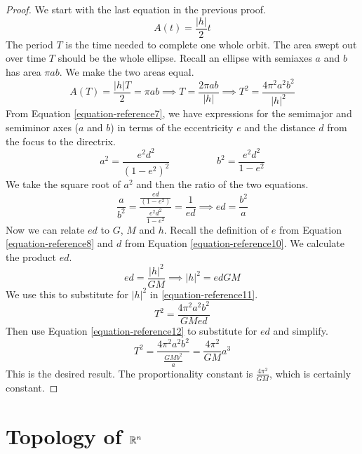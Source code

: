 \documentclass[fleqn,letterpaper]{report}
\begin{document}
\begin{proof}
We start with the last equation in the previous proof.
\begin{equation*}
A(t) = \frac{|h|}{2} t
\end{equation*}
The period $T$ is the time needed to complete one
whole orbit. The area swept out over time $T$ should be the
whole ellipse. Recall an ellipse with semiaxes $a$ and $b$ has
area $\pi a b$. We make the two areas equal.
\begin{equation}
\label{equation-reference11}
A(T) = \frac{|h|T}{2} = \pi a b \implies T = \frac{2\pi ab}{|h|}
\implies T^2 = \frac{4\pi^2 a^2 b^2}{|h|^2}
\end{equation}
From Equation \ref{equation-reference7}, we have expressions for the
semimajor and semiminor axes ($a$ and $b$) in terms of the
eccentricity $e$ and the distance $d$ from the focus to the
directrix. 
\begin{equation*}
a^2 = \frac{e^2 d^2}{(1-e^2)^2} \hspace{2cm} b^2 = \frac{e^2
d^2}{1-e^2}
\end{equation*}
We take the square root of $a^2$ and then the ratio of the
two equations.
\begin{equation}
\label{equation-reference12}
\frac{a}{b^2} =
\frac{\frac{ed}{(1-e^2)}}{\frac{e^2d^2}{1-e^2}} =
\frac{1}{ed} \implies ed = \frac{b^2}{a}
\end{equation}
Now we can relate $ed$ to $G$, $M$ and $h$. Recall the
definition of $e$ from Equation \ref{equation-reference8} and $d$
from Equation \ref{equation-reference10}. We calculate the product
$ed$. 
\begin{equation}
ed = \frac{|h|^2}{GM} \implies |h|^2 = edGM
\end{equation}
We use this to substitute for $|h|^2$ in 
\ref{equation-reference11}.
\begin{equation*}
T^2 = \frac{4\pi^2 a^2 b^2}{GMed} 
\end{equation*}
Then use Equation \ref{equation-reference12} to substitute for $ed$
and simplify. 
\begin{equation*}
T^2= \frac{4\pi^2 a^2 b^2}{\frac{GMb^2}{a}} = \frac{4\pi^2}{GM} a^3
\end{equation*}
This is the desired result. The proportionality constant is
$\frac{4\pi^2}{GM}$, which is certainly constant.
\end{proof}

\chapter{Topology of $\mathbb{R}^n$}
\label{topology}
\end{document}

